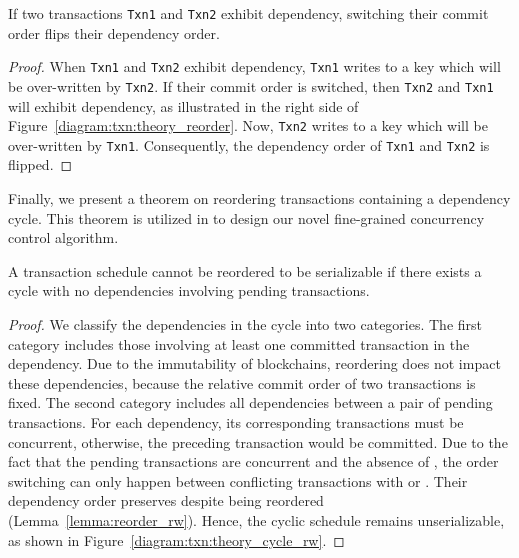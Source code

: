 {\begin{lemma} 
  \label{lemma:reorder_ww}
  If two transactions \texttt{Txn1} and \texttt{Txn2} exhibit 
  dependency, switching their commit order flips their dependency order.
\end{lemma}

\begin{proof}
  When \texttt{Txn1} and \texttt{Txn2} exhibit  dependency,
  \texttt{Txn1} writes to a key which will be over-written by \texttt{Txn2}.
  If their commit order is switched, then \texttt{Txn2} and \texttt{Txn1} will
  exhibit  dependency, as illustrated in the right side of
  Figure~\ref{diagram:txn:theory_reorder}.
  Now, \texttt{Txn2} writes to a key which will be over-written by \texttt{Txn1}.
  Consequently, the dependency order of \texttt{Txn1} and \texttt{Txn2} is flipped.
\end{proof}

Finally, we present a theorem on reordering transactions containing a dependency
cycle. This theorem is utilized in  to
design our novel fine-grained concurrency control algorithm.

\begin{theorem}
  \label{theory:unreorderable}
  A transaction schedule cannot be reordered to be
  serializable if there exists a cycle with no  dependencies involving pending transactions.
\end{theorem}

\begin{proof}
  We classify the dependencies in the cycle into two categories. 
  The first category includes those involving at least one committed transaction in the dependency. 
  Due to the immutability of blockchains, reordering does not impact these dependencies, because the relative commit order of two transactions is fixed.
  The second category includes all dependencies between a pair of pending transactions. 
  For each dependency, its corresponding transactions must be concurrent, otherwise, the preceding transaction would be committed. 
  Due to the fact that the pending transactions are concurrent and the absence of , the order switching can only happen between conflicting transactions with  or .
  Their dependency order preserves despite being reordered (Lemma~\ref{lemma:reorder_rw}).
  Hence, the cyclic schedule remains unserializable, as shown in
  Figure~\ref{diagram:txn:theory_cycle_rw}.
\end{proof}

}
